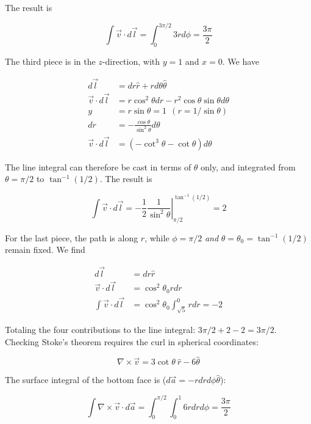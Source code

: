 \documentclass[10pt]{article}
\begin{document}
The result is

\begin{equation}
\int \vec{v} \cdot d\vec{l} = \int_{0}^{3\pi/2} 3 r d\phi = \frac{3\pi}{2}
\end{equation}

The third piece is in the $z$-direction, with $y = 1$ and $x = 0$.  We have

\begin{align}
d\vec{l} &= dr \hat{r} + r d\theta \hat{\theta} \\
\vec{v} \cdot d\vec{l} &= r \cos^2\theta dr - r^2 \cos\theta\sin\theta d\theta \\
y &= r\sin\theta = 1 ~~ (r = 1/\sin\theta) \\
dr &= -\frac{\cos\theta}{\sin^2\theta} d\theta \\
\vec{v} \cdot d\vec{l} &= (-\cot^3\theta - \cot\theta) d\theta
\end{align}

The line integral can therefore be cast in terms of $\theta$ only, and integrated from $\theta = \pi/2$ to $\tan^{-1}(1/2)$.  The result is 

\begin{equation}
\int \vec{v} \cdot d\vec{l} = -\frac{1}{2} \left. \frac{1}{\sin^2\theta} \right|_{\pi/2}^{\tan^{-1}(1/2)} = 2
\end{equation}

For the last piece, the path is along $r$, while $\phi = \pi/2$ \textit{and} $\theta = \theta_0 = \tan^{-1}(1/2)$ remain fixed.  We find

\begin{align}
d\vec{l} &= dr \hat{r} \\
\vec{v} \cdot d\vec{l} &= \cos^2\theta_0 r dr \\
\int \vec{v} \cdot d\vec{l} &= \cos^2\theta_0 \int_{\sqrt{5}}^{0} r dr = -2
\end{align}

Totaling the four contributions to the line integral: $\boxed{3\pi/2 + 2 - 2 = 3\pi/2}$.  Checking Stoke's theorem requires the curl in spherical coordinates:

\begin{equation}
\nabla \times \vec{v} = 3 \cot\theta ~ \hat{r} - 6 \hat{\theta}
\end{equation}

The surface integral of the bottom face is ($d\vec{a} = -r dr d\phi \hat{\theta}$):

\begin{equation}
\int \nabla \times \vec{v} \cdot d\vec{a} = \int_0^{\pi/2} \int_0^{1} 6 r dr d\phi = \frac{3\pi}{2}
\end{equation}
\end{document}
